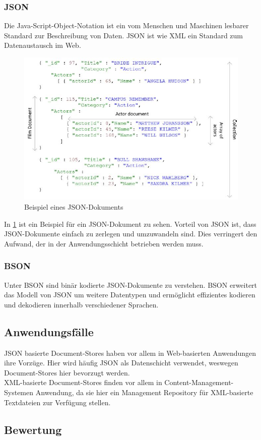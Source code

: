 \subsubsection{JSON}
Die Java-Script-Object-Notation ist ein vom Menschen und Maschinen lesbarer Standard zur Beschreibung von Daten. JSON ist wie XML ein Standard zum Datenaustausch im Web.
\begin{figure}
	\centering
	\includegraphics[scale=0.5]{images/docstores_1.jpg}
	\caption{Beispiel eines JSON-Dokuments}\label{fig:doc1}
\end{figure}
In \ref{fig:doc1} ist ein Beispiel für ein JSON-Dokument zu sehen. Vorteil von JSON ist, dass JSON-Dokumente einfach zu zerlegen und umzuwandeln sind. Dies verringert den Aufwand, der in der Anwendungsschicht betrieben werden muss.
\subsubsection{BSON}
Unter BSON sind binär kodierte JSON-Dokumente zu verstehen. BSON erweitert das Modell von JSON um weitere Datentypen und ermöglicht effizientes kodieren und dekodieren innerhalb verschiedener Sprachen.
\subsection{Anwendungsfälle}
JSON basierte Document-Stores haben vor allem in Web-basierten Anwendungen ihre Vorzüge. Hier wird häufig JSON als Datenschicht verwendet, weswegen Document-Stores hier bevorzugt werden.
\\
XML-basierte Document-Stores finden vor allem in Content-Management-Systemen Anwendung, da sie hier ein Management Repository für XML-basierte Textdateien zur Verfügung stellen.
\subsection{Bewertung}

